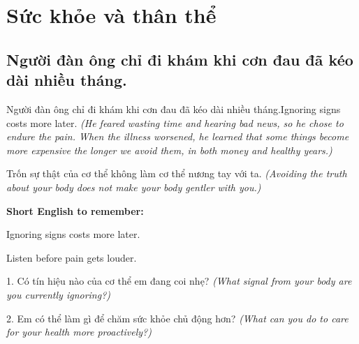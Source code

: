 \chapter{Sức khỏe và thân thể}

\section{Người đàn ông chỉ đi khám khi cơn đau đã kéo dài nhiều tháng.}
\begin{truyen}{Người đàn ông chỉ đi khám khi cơn đau đã kéo dài nhiều tháng.}{Ignoring signs costs more later.}
\textit{(He feared wasting time and hearing bad news, so he chose to endure the pain. When the illness worsened, he learned that some things become more expensive the longer we avoid them, in both money and healthy years.)}
\end{truyen}
\begin{baihoc}
Trốn sự thật của cơ thể không làm cơ thể nương tay với ta.
\textit{(Avoiding the truth about your body does not make your body gentler with you.)}
\end{baihoc}
\begin{ghinhoanh}
\textbf{Short English to remember:}

Ignoring signs costs more later.

Listen before pain gets louder.
\end{ghinhoanh}
\begin{tuhocnhanh}
1. Có tín hiệu nào của cơ thể em đang coi nhẹ? \textit{(What signal from your body are you currently ignoring?)}

2. Em có thể làm gì để chăm sức khỏe chủ động hơn? \textit{(What can you do to care for your health more proactively?)}
\end{tuhocnhanh}
\ngancach

